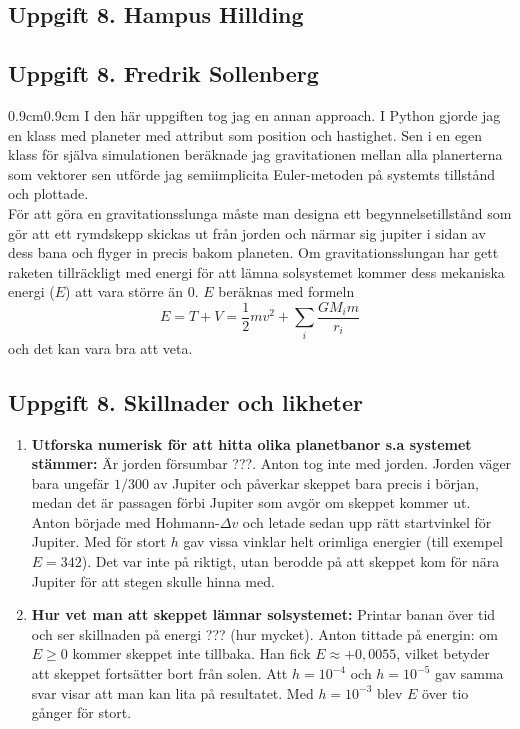 \documentclass{article}
\begin{document}
\subsection*{Uppgift 8. Hampus Hillding}
\subsection*{Uppgift 8. Fredrik Sollenberg}
\begin{adjustwidth}{0.9cm}{0.9cm}
I den här uppgiften tog jag en annan approach. I Python gjorde jag en klass med planeter med attribut som position och hastighet. Sen i en egen klass för själva simulationen beräknade jag gravitationen mellan alla planerterna som vektorer sen utförde jag semiimplicita Euler-metoden på systemts tillstånd och plottade. 
\medskip\\ 
För att göra en gravitationsslunga måste man designa ett begynnelsetillstånd som gör att ett rymdskepp skickas ut från jorden och närmar sig jupiter i sidan av dess bana och flyger in precis bakom planeten. Om gravitationsslungan har gett raketen tillräckligt med energi för att lämna solsystemet kommer dess mekaniska energi ($E$) att vara större än 0. $E$ beräknas med formeln
\[
E =T+V=\frac{1}{2}mv^2+\sum_{i}\frac{GM_im}{r_i}
\]
och det kan vara bra att veta.
\end{adjustwidth}
\subsection*{Uppgift 8. Skillnader och likheter}

\begin{enumerate}
    \item \textbf{Utforska numerisk för att hitta olika planetbanor s.a systemet stämmer:} Är jorden försumbar ???. Anton tog inte med jorden. Jorden väger bara ungefär $1/300$ av Jupiter och
    påverkar skeppet bara precis i början, medan det är passagen förbi Jupiter som
    avgör om skeppet kommer ut. Anton började med Hohmann-$\Delta v$ och letade sedan
    upp rätt startvinkel för Jupiter. Med för stort $h$ gav vissa vinklar helt
    orimliga energier (till exempel $E = 342$). Det var inte på riktigt, utan
    berodde på att skeppet kom för nära Jupiter för att stegen skulle hinna med.
    \item \textbf{Hur vet man att skeppet lämnar solsystemet:} Printar banan över tid och ser skillnaden på energi ??? (hur mycket). Anton tittade på energin: om $E \geq 0$ kommer skeppet inte tillbaka. Han fick
    $E \approx +0{,}0055$, vilket betyder att skeppet fortsätter bort från solen. Att $h = 10^{-4}$ och $h = 10^{-5}$ gav samma svar
    visar att man kan lita på resultatet. Med $h = 10^{-3}$ blev $E$ över tio gånger
    för stort.
\end{enumerate}
\end{document}
